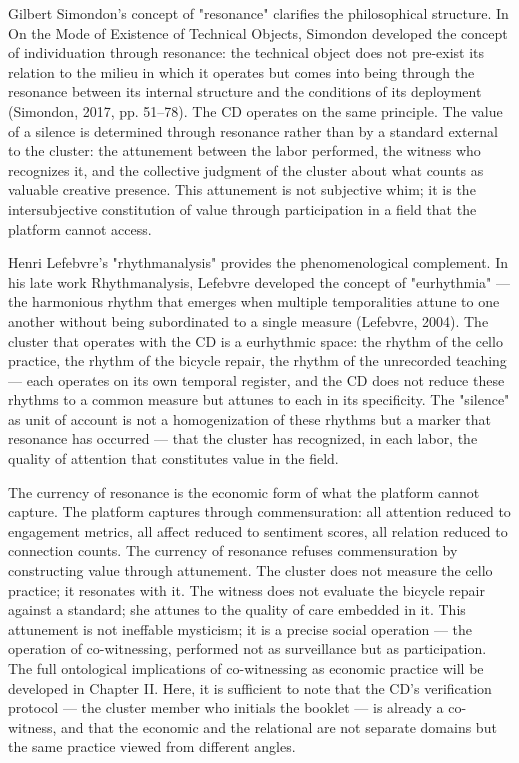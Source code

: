 Gilbert Simondon's concept of "resonance" clarifies the philosophical structure. In On the Mode of Existence of Technical Objects, Simondon developed the concept of individuation through resonance: the technical object does not pre-exist its relation to the milieu in which it operates but comes into being through the resonance between its internal structure and the conditions of its deployment (Simondon, 2017, pp. 51–78). The CD operates on the same principle. The value of a silence is determined through resonance rather than by a standard external to the cluster: the attunement between the labor performed, the witness who recognizes it, and the collective judgment of the cluster about what counts as valuable creative presence. This attunement is not subjective whim; it is the intersubjective constitution of value through participation in a field that the platform cannot access.

Henri Lefebvre's "rhythmanalysis" provides the phenomenological complement. In his late work Rhythmanalysis, Lefebvre developed the concept of "eurhythmia" — the harmonious rhythm that emerges when multiple temporalities attune to one another without being subordinated to a single measure (Lefebvre, 2004). The cluster that operates with the CD is a eurhythmic space: the rhythm of the cello practice, the rhythm of the bicycle repair, the rhythm of the unrecorded teaching — each operates on its own temporal register, and the CD does not reduce these rhythms to a common measure but attunes to each in its specificity. The "silence" as unit of account is not a homogenization of these rhythms but a marker that resonance has occurred — that the cluster has recognized, in each labor, the quality of attention that constitutes value in the field.

The currency of resonance is the economic form of what the platform cannot capture. The platform captures through commensuration: all attention reduced to engagement metrics, all affect reduced to sentiment scores, all relation reduced to connection counts. The currency of resonance refuses commensuration by constructing value through attunement. The cluster does not measure the cello practice; it resonates with it. The witness does not evaluate the bicycle repair against a standard; she attunes to the quality of care embedded in it. This attunement is not ineffable mysticism; it is a precise social operation — the operation of co-witnessing, performed not as surveillance but as participation. The full ontological implications of co-witnessing as economic practice will be developed in Chapter II. Here, it is sufficient to note that the CD's verification protocol — the cluster member who initials the booklet — is already a co-witness, and that the economic and the relational are not separate domains but the same practice viewed from different angles.


